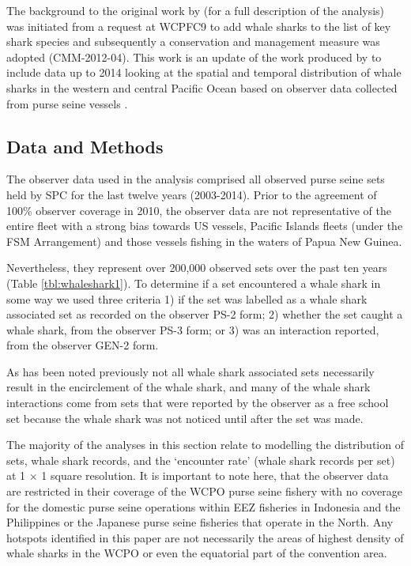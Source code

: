 \documentclass[12pt]{SCreport}
\begin{document}
The background to the original work by \citet{Harley2013_a} (for a full description of the analysis) was initiated from a request at WCPFC9 to add whale sharks to the list of key shark species and subsequently a conservation and management measure was adopted (CMM-2012-04).  This work is an update of the work produced by \citet{Harley2013_a} to include data up to 2014 looking at the spatial and temporal distribution of whale sharks in the western and central Pacific Ocean based on observer data collected from purse seine vessels \citep{OFP2011_a}.
  
\subsection{Data and Methods}
The observer data used in the analysis comprised all observed purse seine sets held by SPC for the last twelve years (2003-2014). Prior to the agreement of 100\% observer coverage in 2010, the observer data are not representative of the entire fleet with a strong bias towards US vessels, Pacific Islands fleets (under the FSM Arrangement) and those vessels fishing in the waters of Papua New Guinea.

Nevertheless, they represent over 200,000 observed sets over the past ten years (Table \ref{tbl:whaleshark1}). To determine if a set encountered a whale shark in some way we used three criteria 1) if the set was labelled as a whale shark associated set as recorded on the observer PS-2 form; 2) whether the set caught a whale shark, from the observer PS-3 form; or 3) was an interaction reported, from the observer GEN-2 form.

As has been noted previously \citep{Harley2013_a} not all whale shark associated sets necessarily result in the encirclement of the whale shark, and many of the whale shark interactions come from sets that were reported by the observer as a free school set because the whale shark was not noticed until after the set was made. 

The majority of the analyses in this section relate to modelling the distribution of sets, whale shark records, and the `encounter rate' (whale shark records per set) at 1 $\times$ 1 \degree square resolution. It is important to note here, that the observer data are restricted in their coverage of the WCPO purse seine fishery with no coverage for the domestic purse seine operations within EEZ fisheries in Indonesia and the Philippines or the Japanese purse seine fisheries that operate in the North. Any hotspots identified in this paper are not necessarily the areas of highest density of whale sharks in the WCPO or even the equatorial part of the convention area.
\end{document}
